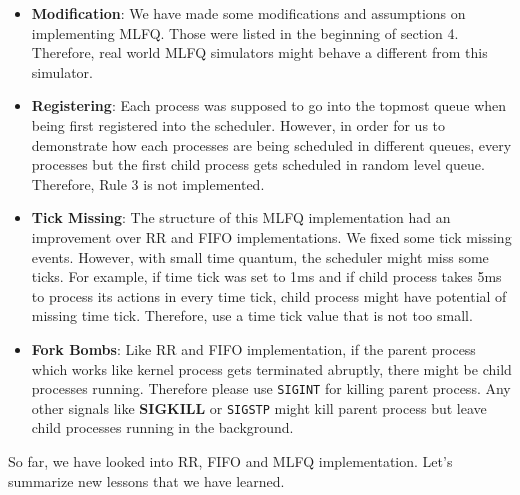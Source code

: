 \documentclass{homework}
\begin{document}
\begin{itemize}
    \item \textbf{Modification}: We have made some modifications and assumptions on implementing MLFQ. Those were listed in the beginning of section 4. Therefore, real world MLFQ simulators might behave a different from this simulator.
    \item \textbf{Registering}: Each process was supposed to go into the topmost queue when being first registered into the scheduler. However, in order for us to demonstrate how each processes are being scheduled in different queues, every processes but the first child process gets scheduled in random level queue. Therefore, Rule 3 is not implemented.
    \item \textbf{Tick Missing}: The structure of this MLFQ implementation had an improvement over RR and FIFO implementations. We fixed some tick missing events. However, with small time quantum, the scheduler might miss some ticks. For example, if time tick was set to 1ms and if child process takes 5ms to process its actions in every time tick, child process might have potential of missing time tick. Therefore, use a time tick value that is not too small.
    \item \textbf{Fork Bombs}: Like RR and FIFO implementation, if the parent process which works like kernel process gets terminated abruptly, there might be child processes running. Therefore please use \texttt{SIGINT} for killing parent process. Any other signals like \textbf{SIGKILL} or \texttt{SIGSTP} might kill parent process but leave child processes running in the background.
\end{itemize}
So far, we have looked into RR, FIFO and MLFQ implementation. Let's summarize new lessons that we have learned.
\pagebreak
\end{document}
